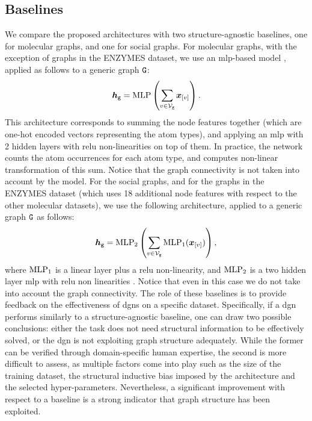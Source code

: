 \subsection{Baselines}
We compare the proposed architectures with two structure-agnostic baselines, one for molecular graphs, and one for social graphs. For molecular graphs, with the exception of graphs in the ENZYMES dataset, we use an \gls{mlp}-based model \citep{ralaivola2005graphkernels}, applied as follows to a generic graph $\GraphU{g}$:
$$\GraphRepr{g} = \Fun{MLP}\Par{\sum_{v \in \Nodes{g}} \Elem{x}{v}}.$$
This architecture corresponds to summing the node features together (which are one-hot encoded vectors representing the atom types), and applying an \gls{mlp} with 2 hidden layers with \gls{relu} non-linearities on top of them. In practice, the network counts the atom occurrences for each atom type, and computes non-linear transformation of this sum. Notice that the graph connectivity is not taken into account by the model.
For the social graphs, and for the graphs in the ENZYMES dataset (which uses 18 additional node features with respect to the other molecular datasets), we use the following architecture, applied to a generic graph $\GraphU{g}$ as follows:
$$\GraphRepr{g} = \Fun{MLP}_2\Par{\sum_{v \in \Nodes{g}} \Fun{MLP}_1(\Elem{x}{v})},$$
where $\mathrm{MLP}_1$ is a linear layer plus a \gls{relu} non-linearity, and $\mathrm{MLP}_2$ is a two hidden layer \gls{mlp} with \gls{relu} non linearities \citep{zaheer2017deepsets}. Notice that even in this case we do not take into account the graph connectivity. The role of these baselines is to provide feedback on the effectiveness of \glspl{dgn} on a specific dataset. Specifically, if a \gls{dgn} performs similarly to a structure-agnostic baseline, one can draw two possible conclusions: either the task does not need structural information to be effectively solved, or the \gls{dgn} is not exploiting graph structure adequately. While the former can be verified through domain-specific human expertise, the second is more difficult to assess, as multiple factors come into play such as the size of the training dataset, the structural inductive bias imposed by the architecture and the selected hyper-parameters. Nevertheless, a significant improvement with respect to a baseline is a strong indicator that graph structure has been exploited.

